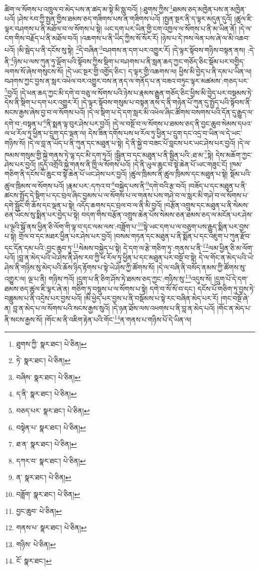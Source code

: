 ཚིག་ལ་སོགས་པ་འཁྲུལ་བ་མེད་པས་ན་ཚད་མ་སྟེ་མི་སླུ་བའོ། །:ཐུགས་ཀྱིས་\footnote{ཐུགས་ཀྱི་  སྣར་ཐང་།  པེ་ཅིན། }ཐམས་ཅད་མཁྱེན་པས་ན་མཁྱེན་པའོ། །ཤེས་རབ་ཀྱི་སྤྱན་གྱིས་ཐམས་ཅད་གཟིགས་པས་ན་གཟིགས་པའོ། །སྤྱན་སྔར་ནི་ད་ལྟར་མདུན་དུའོ། །ཚུལ་ཇི་ལྟར་བཤགས་པ་ནི་མཐོལ་བ་ལ་སོགས་པ་སྟེ། ཡང་དག་པར་ཡིན་གྱི་ངག་འཁྱལ་ལ་སོགས་པ་ནི་མ་ཡིན་ནོ། །དེ་ལ་ངག་གིས་བརྗོད་པ་ནི་མཐོལ་བའོ། །འཆགས་པ་ནི་ཡིད་ཀྱིས་སོ་སོར་རོ། །ཉེས་པ་དེ་ཁས་ལེན་པས་ཞེ་ལ་མི་འཆབ་པའོ། །མི་སྦེད་པ་ནི་དངོས་སུ་སྟེ། \footnote{ཏེ་  སྣར་ཐང་།  པེ་ཅིན། }དེ་བཞིན་\footnote{བཞིས་  སྣར་ཐང་།  པེ་ཅིན། }བཤགས་ན་དག་པར་འགྱུར་རོ། །དེ་ལྟར་སྟོབས་གཉིས་བསྟན་ནས། :དེ་ནི་\footnote{ད་ནི་  སྣར་ཐང་།  པེ་ཅིན། }ཉེས་པ་ལས་ཀུན་ཏུ་ལྡོག་པའི་སྟོབས་ཀྱིས་སྡིག་པ་བཤགས་པ་ནི་སླན་ཆད་ཀྱང་གཅོད་ཅིང་སྡོམ་པར་བགྱིད་ལགས་སོ་ཞེས་གསུངས་སོ། །དེ་ཡང་སྔར་གྱི་འགྱོད་ཅིང་། ད་ལྟར་གྱི་འཆགས་ལ། ཕྱིས་མི་བྱེད་པ་ནི་དམ་པ་ཡིན་ལ། བཤགས་ཀྱང་བྱས་ན་སླར་འཕེལ་བར་འགྱུར་བས་ན་ནད་ལ་གནོད་པ་ན་བཟའ་བཏུང་ལྟར་མཚམས་:གཅད་པར་\footnote{བཅད་པར་  སྣར་ཐང་།  པེ་ཅིན། }བྱའོ། །དེ་ཕན་ཆད་ཀྱང་མི་དགེ་བ་བཅུ་ལ་སོགས་པའི་ཉེས་པ་རྣམས་རྒྱུན་གཅོད་ཅིང་ཕྱིས་མི་བྱེད་པར་བསྡམས་ཏེ་དེས་ནི་སྡིག་པ་དག་པར་འགྱུར་རོ། །དེ་ལྟར་སྟོབས་གསུམ་པ་བསྟན་ནས་ད་ནི་གཉེན་པོ་ཀུན་དུ་སྤྱོད་པའི་སྟོབས་ནི་སངས་རྒྱས་ཞེས་བྱ་བ་ལ་སོགས་པའོ། །དེ་ལ་སྡིག་པ་དེ་དག་སླར་མི་འཕེལ་ཞིང་ཚོགས་བསགས་པའི་དོན་དུ་རྒྱུད་ལ་དགེ་བ་:བསྟན་པ་\footnote{བསྟེན་པ་  སྣར་ཐང་།  པེ་ཅིན། }ནི་སྨན་ལྟ་བུར་ཤེས་པར་བྱའོ། །དེ་ལ་བསྔོ་བ་ལ་སོགས་པ་ཐམས་ཅད་ནི་བྱང་ཆུབ་སེམས་དཔའ་ལ་ཕ་རོལ་ཏུ་ཕྱིན་པ་དྲུག་དང་ལྡན་ལ། དེས་ཟིན་དགོས་པས་ཕ་རོལ་ཏུ་ཕྱིན་པ་དྲུག་དང་འདྲ་བ་ཡིན་ལ་དེ་ཡང་གཉིས་སོ། །དེ་ལ་བླ་ན་ཡོད་པ་ནི་ཀུན་དང་མཐུན་པ་སྟེ། དེ་ནི་སྐྱེ་བ་བཟང་པོ་བླངས་པར་ཡང་ཤེས་པར་བྱའོ། །དེ་ལ་ཁམས་གསུམ་གྱི་སྐྱེ་གནས་ཏེ་ལྷ་དང་མི་དག་ཏུའོ། །སྦྱིན་བ་དང་མཐུན་པ་ནི་སྦྱིན་པའི་:ཐ་མ་\footnote{ཐ་ན་  སྣར་ཐང་།  པེ་ཅིན། }སྟེ། དེས་མཆོག་ཀྱང་ཤེས་པར་བྱའོ། །དུད་འགྲོའི་སྐྱེ་གནས་ནི་ཁྱི་ལ་སོགས་པའོ། །དེ་ནི་ཡུལ་ཆུང་བ་སྟེ་ཆེན་པོ་ཡང་གཟུང་ངོ། །ཁམ་གཅིག་ནི་དངོས་པོ་ཆུང་བ་སྟེ་ཆེན་པོ་ཡང་ཤེས་པར་བྱའོ། །ཚུལ་ཁྲིམས་ནི་ཚུལ་ཁྲིམས་དང་མཐུན་པ་སྟེ། སྡོམ་པའི་ཚུལ་ཁྲིམས་ལ་སོགས་པའོ། །རྣམ་པར་:དཀའ་བ་\footnote{དཀར་བ་  སྣར་ཐང་།  པེ་ཅིན། }བསྐྱེད་པས་ནི་\footnote{ན་  སྣར་ཐང་།  པེ་ཅིན། }དགེ་བའི་རྩ་བའོ། །བཟོད་པ་དང་མཐུན་པ་ནི་ཚངས་སྤྱོད་དེ་སྡིག་པ་དང་བྲལ་ཞིང་བྱམས་པ་ལ་སོགས་པ་ལ་གནས་པས་གཤེ་བ་ལ་སླར་མི་གཤེ་བ་ལ་སོགས་པ་དགེ་སྦྱོང་གི་ཆོས་དང་ལྡན་པ་སྟེ། འདོད་ཆགས་དང་བྲལ་བ་ལ་ནི་མི་བྱའོ། །བརྩོན་འགྲུས་དང་མཐུན་པ་ནི་སེམས་ཅན་ཡོངས་སུ་སྨིན་པར་བྱེད་པ་སྟེ། བདག་གིས་བརྩོན་འགྲུས་ཆེན་པོས་སེམས་ཅན་ཐམས་ཅད་ལ་མངོན་པར་ཤེས་པ་ལྔའི་སྒོ་ནས་ཕྱིན་ཅི་ལོག་གི་ལྟ་བ་དང་ལམ་ལས་:བཟློག་པ་\footnote{བཟློག་  སྣར་ཐང་།  པེ་ཅིན། }སྟེ་ཡང་དག་པ་ལ་བཅུག་པས་རྒྱུད་སྨིན་པར་བྱས་པ་སྟེ། གྲོལ་བ་དང་མཐར་ཕྱིན་པར་ཤེས་པར་བྱའོ། །བསམ་གཏན་དང་མཐུན་པ་ནི་སྨོན་པ་དང་འཇུག་པ་ཀུན་རྫོབ་དང་དོན་དམ་པའི་:བྱང་ཆུབ་ཏུ་\footnote{བྱང་ཆུབ་  པེ་ཅིན། }སེམས་བསྐྱེད་པ་སྟེ། དེ་དག་ལ་རྩེ་གཅིག་ཏུ་:གནས་པ་ནི་\footnote{གནས་པ་  སྣར་ཐང་།  པེ་ཅིན། }ལམ་ཕྱིན་ཅི་མ་ལོག་པའོ། །བླ་ན་མེད་པའི་ཡེ་ཤེས་ནི་ཤེས་རབ་ཀྱི་ཕ་རོལ་ཏུ་ཕྱིན་པ་དང་མཐུན་པར་བསྔོ་བ་སྟེ། དེ་ལ་གོང་ན་མེད་པའི་ཡེ་ཤེས་ནི་གཉིས་སུ་མེད་པའི་ཆོས་ཉིད་རྟོགས་པ་སྟེ་ཡེ་ཤེས་ཀྱི་ཚོགས་སོ། །དེ་ལ་བཞི་ནི་བསོད་ནམས་ཀྱི་ཚོགས་སུ་འགྱུར་ལ། ལྔ་པ་ནི། གཉིས་ཀའོ། །དྲུག་པ་ནི་ཅིག་ཤོས་ཏེ་ཐམས་ཅད་ཀྱང་:གཉིས་སུ་\footnote{གཉིས་  པེ་ཅིན། }འདུས་སོ། །དྲུག་པོ་དེ་དག་ཐམས་ཅད་ཚུལ་ཇི་ལྟར་ཞེ་ན། གཅིག་ཏུ་བསྡུས་པ་ལ་སོགས་པ་སྟེ། དགེ་བ་སོ་སོ་བ་དང་། དངོས་པོ་གཅིག་ཏུ་བྱས་ཏེ་བཟླུམས་པ་ནི་འདྲེས་པར་བྱས་པའོ། །མི་ཕྱེད་པར་བྱས་པ་ནི་བསྡོམས་པ་སྟེ་རང་བཞིན་མེད་པར་རོ། །གང་བསྔོ་ཞེ་ན། བླ་ན་མེད་པ་ལ་སོགས་པའི་སངས་རྒྱས་སུའོ། །དེ་ཉན་ཐོས་ལས་འཕགས་པ་ནི་བླ་ན་མེད་པའོ། །གོང་ན་མེད་པ་ནི་སངས་རྒྱས་སོ། །གོང་མ་ནི་འཇིག་རྟེན་པའི་གོང་\footnote{ངོ་  སྣར་ཐང་། }ན་གནས་པ་གཉིས་པོ་དེ་ཡིན་ལ། 